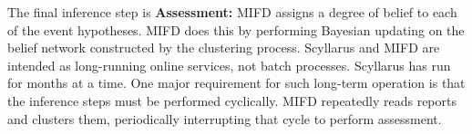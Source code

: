 The final inference step is \textbf{Assessment:} MIFD assigns a degree of belief
to each of the event hypotheses.
MIFD does this by performing Bayesian updating on the belief network constructed
by the clustering process. 
Scyllarus and MIFD are intended as long-running online services, not batch processes.
Scyllarus has run for months at a time.
One major requirement for such long-term operation is that the
inference steps must be performed cyclically.  MIFD repeatedly reads
reports and clusters them, periodically interrupting that
cycle to perform assessment.



